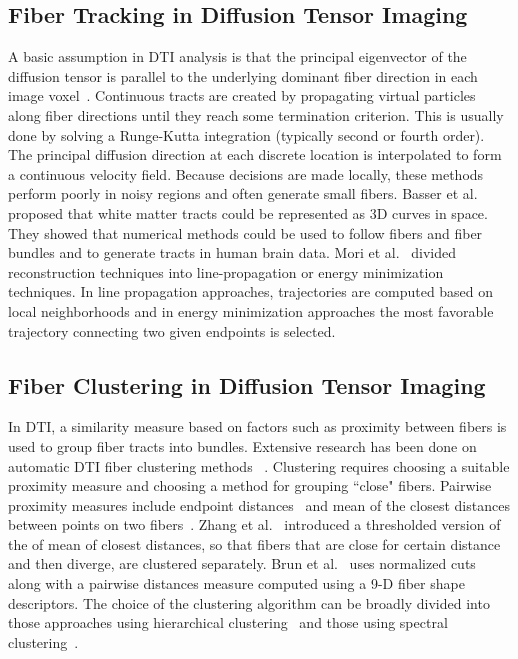 \subsection {Fiber Tracking in Diffusion Tensor Imaging}
\label{subsec:fiberEx} 
A basic assumption in DTI analysis is that the principal eigenvector of the diffusion tensor is parallel to the underlying dominant fiber direction in each image voxel~\cite{Basser2002, Basser2000, Mori1999, Mori2002}. Continuous tracts are created by propagating virtual particles along fiber directions until they reach some termination criterion. 
This is usually done by solving a Runge-Kutta integration (typically second or fourth order). The principal diffusion direction at each discrete location is interpolated to form a continuous velocity field. 
Because decisions are made locally, these methods perform poorly in noisy regions and often generate small fibers. Basser et al.~\cite{Basser2002,Basser2000} proposed that white matter tracts could be represented as 3D curves in space. They showed that numerical methods could be used to follow fibers and fiber bundles and to generate tracts in human brain data. 
Mori et al.~\cite{Mori1999,Mori2002} divided reconstruction techniques into line-propagation or energy minimization techniques. In line propagation approaches, trajectories are computed based on local neighborhoods and in energy minimization approaches the most  favorable trajectory connecting two given endpoints is selected. 


\subsection {Fiber Clustering in Diffusion Tensor Imaging}
\label {subsec:fiberClus}
In DTI, a similarity measure based on factors such as proximity between fibers is used to group fiber tracts into bundles. Extensive research has been done on automatic DTI fiber clustering methods~ \cite{Brun2004,Brun2003,Corouge2004,westinMEDIA02,Zhang2008}. 
Clustering requires choosing a suitable proximity measure and choosing a method for grouping ``close" fibers.
Pairwise proximity measures include endpoint distances~\cite{Brun2003} and mean of the closest distances between points on two fibers~\cite{Corouge2004}. Zhang et al.~\cite{Zhang2008} introduced a thresholded version of the of mean of closest distances, so that fibers that are close for certain distance and then diverge, are clustered separately. Brun et al.~\cite{Brun2004} uses normalized cuts along with a pairwise distances  measure computed using a 9-D fiber shape descriptors. The choice of the clustering algorithm can be broadly divided into those approaches using hierarchical clustering~\cite{Moberts2005, Zhang2008} and those using spectral clustering~\cite{ Brun2004,jonasson2005, ODonnell2007}.
 
